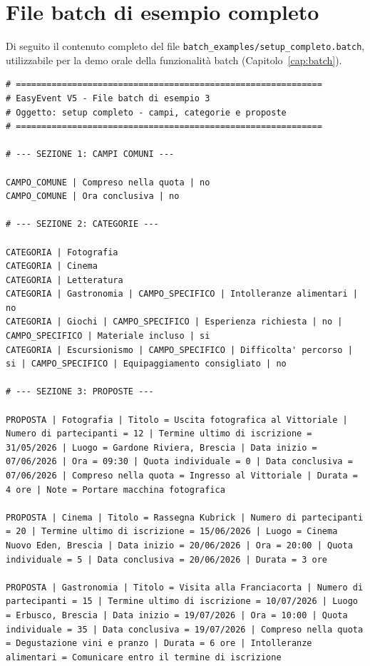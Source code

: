 \documentclass[12pt,a4paper,oneside]{report}
\newcommand{\file}[1]{\texttt{\small#1}}
\begin{document}
\chapter{File batch di esempio completo}
\label{app:batch}

Di seguito il contenuto completo del file \file{batch\_examples/setup\_completo.batch}, utilizzabile per la demo orale della funzionalità batch (Capitolo~\ref{cap:batch}).

\begin{lstlisting}[style=batch, caption={setup\_completo.batch}, captionpos=b]
# ============================================================
# EasyEvent V5 - File batch di esempio 3
# Oggetto: setup completo - campi, categorie e proposte
# ============================================================

# --- SEZIONE 1: CAMPI COMUNI ---

CAMPO_COMUNE | Compreso nella quota | no
CAMPO_COMUNE | Ora conclusiva | no

# --- SEZIONE 2: CATEGORIE ---

CATEGORIA | Fotografia
CATEGORIA | Cinema
CATEGORIA | Letteratura
CATEGORIA | Gastronomia | CAMPO_SPECIFICO | Intolleranze alimentari | no
CATEGORIA | Giochi | CAMPO_SPECIFICO | Esperienza richiesta | no | CAMPO_SPECIFICO | Materiale incluso | si
CATEGORIA | Escursionismo | CAMPO_SPECIFICO | Difficolta' percorso | si | CAMPO_SPECIFICO | Equipaggiamento consigliato | no

# --- SEZIONE 3: PROPOSTE ---

PROPOSTA | Fotografia | Titolo = Uscita fotografica al Vittoriale | Numero di partecipanti = 12 | Termine ultimo di iscrizione = 31/05/2026 | Luogo = Gardone Riviera, Brescia | Data inizio = 07/06/2026 | Ora = 09:30 | Quota individuale = 0 | Data conclusiva = 07/06/2026 | Compreso nella quota = Ingresso al Vittoriale | Durata = 4 ore | Note = Portare macchina fotografica

PROPOSTA | Cinema | Titolo = Rassegna Kubrick | Numero di partecipanti = 20 | Termine ultimo di iscrizione = 15/06/2026 | Luogo = Cinema Nuovo Eden, Brescia | Data inizio = 20/06/2026 | Ora = 20:00 | Quota individuale = 5 | Data conclusiva = 20/06/2026 | Durata = 3 ore

PROPOSTA | Gastronomia | Titolo = Visita alla Franciacorta | Numero di partecipanti = 15 | Termine ultimo di iscrizione = 10/07/2026 | Luogo = Erbusco, Brescia | Data inizio = 19/07/2026 | Ora = 10:00 | Quota individuale = 35 | Data conclusiva = 19/07/2026 | Compreso nella quota = Degustazione vini e pranzo | Durata = 6 ore | Intolleranze alimentari = Comunicare entro il termine di iscrizione


\end{lstlisting}
\end{document}
